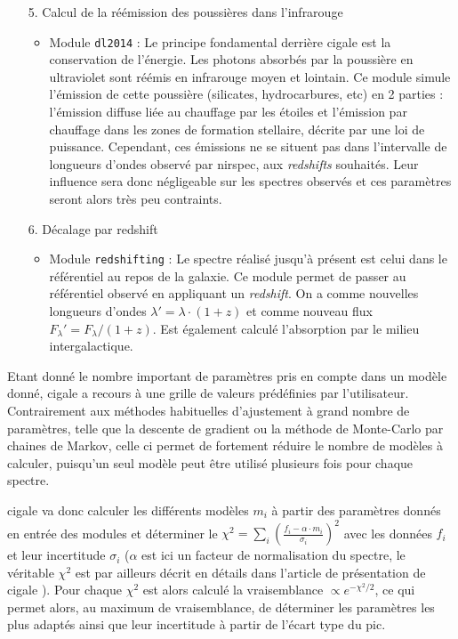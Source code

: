 \documentclass[12pt, a4paper]{article}
\begin{document}
\begin{itemize}
  \item[5.] Calcul de la réémission des poussières dans l'infrarouge
  \begin{itemize}
    \item Module \texttt{dl2014} : Le principe fondamental derrière \gls{cigale} est la conservation de l'énergie. Les photons absorbés par la poussière en ultraviolet sont réémis en infrarouge moyen et lointain. Ce module simule l'émission de cette poussière (silicates, hydrocarbures, etc) en 2 parties : l'émission diffuse liée au chauffage par les étoiles et l'émission par chauffage dans les zones de formation stellaire, décrite par une loi de puissance. Cependant, ces émissions ne se situent pas dans l'intervalle de longueurs d'ondes observé par \gls{nirspec}, aux \textit{redshifts} souhaités. Leur influence sera donc négligeable sur les spectres observés et ces paramètres seront alors très peu contraints.
    
  \end{itemize}
  \item[6.] Décalage par redshift
  \begin{itemize}
    \item Module \texttt{redshifting} : Le spectre réalisé jusqu'à présent est celui dans le référentiel au repos de la galaxie. Ce module permet de passer au référentiel observé en appliquant un \textit{redshift}. On a comme nouvelles longueurs d'ondes $\lambda' = \lambda \cdot (1+z)$ et comme nouveau flux $F_\lambda' = F_\lambda / (1+z)$. Est également calculé l'absorption par le milieu intergalactique.
  
  \end{itemize}
\end{itemize}

Etant donné le nombre important de paramètres pris en compte dans un modèle donné, \gls{cigale} a recours à une grille de valeurs prédéfinies par l'utilisateur. Contrairement aux méthodes habituelles d'ajustement à grand nombre de paramètres, telle que la descente de gradient ou la méthode de Monte-Carlo par chaines de Markov, celle ci permet de fortement réduire le nombre de modèles à calculer, puisqu'un seul modèle peut être utilisé plusieurs fois pour chaque spectre.

\gls{cigale} va donc calculer les différents modèles $m_i$ à partir des paramètres donnés en entrée des modules et déterminer le $\chi^2 = \sum_{i} (\frac{f_i - \alpha \cdot m_i}{\sigma_i})^2$ avec les données $f_i$ et leur incertitude $\sigma_i$ ($\alpha$ est ici un facteur de normalisation du spectre, le véritable $\chi^2$ est par ailleurs décrit en détails dans l'article de présentation de \gls{cigale} \parencite{cigale}). Pour chaque $\chi^2$ est alors calculé la vraisemblance $\propto e^{-\chi^2 / 2}$, ce qui permet alors, au maximum de vraisemblance, de déterminer les paramètres les plus adaptés ainsi que leur incertitude à partir de l'écart type du pic.\\
\end{document}
